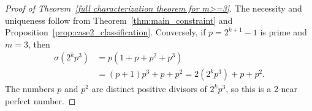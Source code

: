 \documentclass[10pt]{article}
\newtheorem{theorem}{Theorem}
\newtheorem{proposition}{Proposition}
\theoremstyle{definition}
\begin{document}

\begin{proof}[Proof of Theorem~\ref{full characterization theorem for m>=3}]
The necessity and uniqueness follow from Theorem~\ref{thm:main_constraint}
and Proposition~\ref{prop:case2_classification}.
Conversely, if $p=2^{k+1}-1$ is prime and $m=3$, then
\begin{align*}
\sigma(2^kp^3)
&=p(1+p+p^2+p^3)\\
&=(p+1)p^3+p+p^2
=2(2^kp^3)+p+p^2.
\end{align*}
The numbers $p$ and $p^2$ are distinct positive divisors of $2^kp^3$,
so this is a $2$-near perfect number.
\end{proof}

\end{document}
